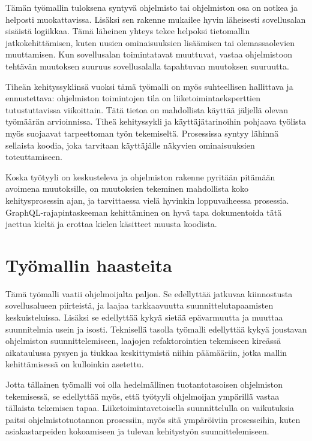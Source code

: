 Tämän työmallin tuloksena syntyvä ohjelmisto tai ohjelmiston osa on
notkea ja helposti muokattavissa. Lisäksi sen rakenne mukailee hyvin
läheisesti sovellusalan sisäistä logiikkaa. Tämä läheinen yhteys tekee
helpoksi tietomallin jatkokehittämisen, kuten uusien ominaisuuksien
lisäämisen tai olemassaolevien muuttamisen. Kun sovellusalan
toimintatavat muuttuvat, vastaa ohjelmistoon tehtävän muutoksen suuruus
sovellusalalla tapahtuvan muutoksen suuruutta.

Tiheän kehityssyklinsä vuoksi tämä työmalli on myös suhteellisen
hallittava ja ennustettava: ohjelmiston toimintojen tila on
liiketoimintaeksperttien tutustuttavissa viikoittain. Tätä tietoa on
mahdollista käyttää jäljellä olevan työmäärän arvioinnissa. Tiheä
kehityssykli ja käyttäjätarinoihin pohjaava työlista myös suojaavat
tarpeettoman työn tekemiseltä. Prosessissa syntyy lähinnä sellaista
koodia, joka tarvitaan käyttäjälle näkyvien ominaisuuksien
toteuttamiseen.

Koska työtyyli on keskusteleva ja ohjelmiston rakenne pyritään pitämään
avoimena muutoksille, on muutoksien tekeminen mahdollista koko
kehitysprosessin ajan, ja tarvittaessa vielä hyvinkin loppuvaiheessa
prosessia. GraphQL-rajapintaskeeman kehittäminen on hyvä tapa
dokumentoida tätä jaettua kieltä ja erottaa kielen käsitteet muusta
koodista.

\hypertarget{tyuxf6mallin-haasteita}{%
\section{Työmallin haasteita}\label{tyuxf6mallin-haasteita}}

Tämä työmalli vaatii ohjelmoijalta paljon. Se edellyttää jatkuvaa
kiinnostusta sovellusalueen piirteistä, ja laajaa tarkkaavuutta
suunnittelutapaamisten keskuisteluissa. Lisäksi se edellyttää kykyä
sietää epävarmuutta ja muuttaa suunnitelmia usein ja isosti. Teknisellä
tasolla työmalli edellyttää kykyä joustavan ohjelmiston
suunnittelemiseen, laajojen refaktorointien tekemiseen kireässä
aikataulussa pysyen ja tiukkaa keskittymistä niihin päämääriin, jotka
mallin kehittämisessä on kulloinkin asetettu.

Jotta tällainen työmalli voi olla hedelmällinen tuotantotasoisen
ohjelmiston tekemisessä, se edellyttää myös, että työtyyli ohjelmoijan
ympärillä vastaa tällaista tekemisen tapaa. Liiketoimintavetoisella
suunnittelulla on vaikutuksia paitsi ohjelmistotuotannon prosessiin,
myös sitä ympäröiviin prosesseihin, kuten asiakastarpeiden kokoamiseen
ja tulevan kehitystyön suunnittelemiseen.

